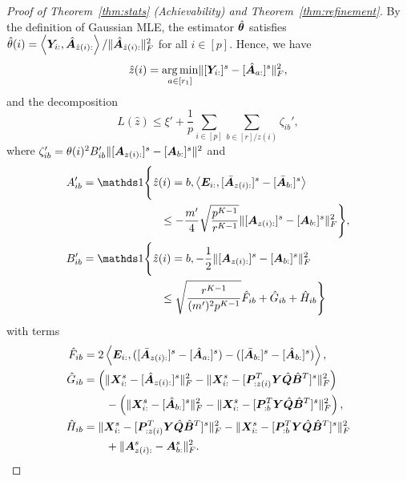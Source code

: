 \documentclass[journal]{IEEEtran}
\theoremstyle{definition}
\theoremstyle{definition}
\newcommand{\of}[1]{\left(#1\right)}
\newcommand{\ang}[1]{\left\langle#1\right\rangle}
\begin{document}
\begin{proof}[Proof of Theorem~\ref{thm:stats} (Achievability) and Theorem~\ref{thm:refinement}]
{    By the definition of Gaussian MLE, the estimator $\hat {\boldsymbol{\theta}}$ satisfies $\hat \theta(i)  = \ang{ \mY_{i:} , \hat \mA_{\hat z(i):} }/{\onormSize{}{ \hat \mA_{\hat z(i):}}_F^2}$ for all $i \in [p]$.
Hence, we have 
\begin{equation}
    \hat z(i) = \operatorname*{arg\,min}_{a \in [r_1]} \lVert [\bm Y_{ i:}]^s - [\hat {\bm A}_{a:}]^s\rVert_F^2,
\end{equation}
and the decomposition 
 \begin{equation}
        L(\hat z) \leq \xi' + \frac{1}{p}\sum_{i \in [p] }  \sum_{b \in [r]/z(i)}  \zeta_{ib}', 
    \end{equation}
    where $ \zeta_{ib}' =   \theta(i)^2 B_{ib}' \lVert [ \bm A_{ z(i):}  ]^s - [ \bm A_{b:}  ]^s  \rVert^2$ and 
    \small
    \begin{align}
        A'_{ib} &= \ind \Bigg\{  \hat z(i)  = b,   \ang{\mE_{i:}, [\bar \mA_{z(i):}]^s - [\bar \mA_{b:}]^s }  \\
        & \quad \quad \quad \quad \quad \quad \quad  \leq - \frac{m'}{4}  \sqrt{\frac{p^{K-1}}{r^{K-1}}} \onormSize{}{ [\mA_{z(i):}]^s -  [\mA_{b:}]^s  }_F^2 \Bigg\}, \\
    B'_{ib} &= \ind \Bigg\{ \hat z(i)  = b,     - \frac{1}{2}  \onormSize{}{ [\mA_{z(i):}]^s -  [\mA_{b:}]^s  }_F^2  \\
    & \quad \quad \quad \quad \quad \quad \quad  \leq \sqrt{\frac{r^{K-1}}{(m')^2 p^{K-1}}}  \hat F_{ib} + \hat G_{ib} + \hat H_{ib} \Bigg\}
    \end{align}
    \normalsize
    with terms 
    \begin{align}
    \hat F_{ib} &= 2 \ang{ \mE_{i:}, ([\bar  \mA_{z(i):}]^s - [\hat \mA_{a:}]^s) - ([\bar  \mA_{b:}]^s - [\hat \mA_{b:}]^s) }, \\
    \hat G_{ib}& = \of{ \onormSize{}{\mX_{i:}^s - [\hat \mA_{z(i):}]^s}_F^2 - \onormSize{}{ \mX^s_{i:} - [\mP_{:z(i)}^T \mY \hat \mQ \hat \mB^T ]^s }_F^2  } \\
    & \quad \quad - \of{ \onormSize{}{\mX^s_{i:} - [\hat \mA_{b:}]^s}_F^2 - \onormSize{}{ \mX^s_{i:} - [\mP_{:b}^T \mY \hat \mQ \hat \mB^T]^s }_F^2   }, \\
   \hat  H_{ib}& = \onormSize{}{ \mX^s_{i:} - [\mP_{:z(i)}^T \mY \hat \mQ \hat \mB^T]^s }_F^2 - \onormSize{}{ \mX^s_{i:} - [\mP_{:b}^T \mY \hat \mQ \hat \mB^T]^s }_F^2 \\
   & \quad \quad + \onormSize{}{ \mA^s_{z(i):} -  \mA^s_{b:}  }_F^2.
\end{align}
    
    }
   



\end{proof}
\end{document}

